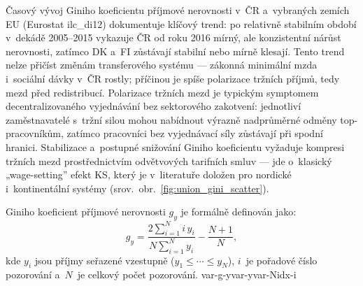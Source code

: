 Časový vývoj Giniho koeficientu příjmové nerovnosti v~ČR a~vybraných zemích \ac{EU} (Eurostat ilc\_di12) dokumentuje klíčový trend: po relativně stabilním období v~dekádě 2005--2015 vykazuje ČR od roku 2016 mírný, ale konzistentní nárůst nerovnosti, zatímco DK a~FI zůstávají stabilní nebo mírně klesají.
Tento trend nelze přičíst změnám transferového systému --- zákonná minimální mzda i~sociální dávky v~ČR rostly; příčinou je spíše polarizace tržních příjmů, tedy mezd před redistribucí.
Polarizace tržních mezd je typickým symptomem decentralizovaného vyjednávání bez sektorového zakotvení: jednotliví zaměstnavatelé s~tržní silou mohou nabídnout výrazně nadprůměrné odměny top-pracovníkům, zatímco pracovníci bez vyjednávací síly zůstávají při spodní hranici.
Stabilizace a~postupné snižování Giniho koeficientu vyžaduje kompresi tržních mezd prostřednictvím odvětvových tarifních smluv --- jde o~klasický „wage-setting” efekt \ac{KS}, který je v~literatuře doložen pro nordické i~kontinentální systémy (srov.~obr.~\ref{fig:union_gini_scatter}).

Giniho koeficient příjmové nerovnosti $g_y$ je formálně definován jako:
\begin{equation}\label{eq:gini_y}
  g_y = \frac{2\displaystyle\sum_{i=1}^{N} i\,y_i}{N\displaystyle\sum_{i=1}^{N} y_i} - \frac{N+1}{N},
\end{equation}
kde $y_i$ jsou příjmy seřazené vzestupně ($y_1 \leq \cdots \leq y_N$),
$i$~je pořadové číslo pozorování a~$N$~je celkový počet pozorování.
\acs{var-g-y}\acs{var-y}\acs{var-N}\acs{idx-i}


